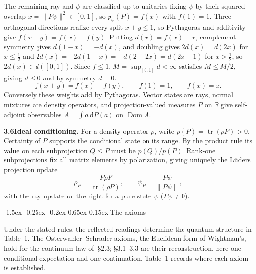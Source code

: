 \documentclass[10pt,a4paper]{article}
\makeatletter
\renewcommand\section{\@startsection{section}{1}{\z@}%
  {-1.5ex \@plus -0.25ex \@minus -0.2ex}%
  {0.65ex \@plus 0.15ex}%
  {\normalfont\large\bfseries}}
\newcommand{\dd}{\mathrm{d}}
\newcommand{\R}{\mathbb{R}}
\newcommand{\tr}{\operatorname{tr}}
\newcommand{\Dom}{\operatorname{Dom}}
\makeatother
\begin{document}
The remaining ray and $\psi$ are classified up to unitaries fixing $\psi$ by their squared overlap $x = \|P\psi\|^2 \in [0, 1]$, so $p_\psi(P) = f(x)$ with $f(1) = 1$. Three orthogonal directions realize every split $x + y \le 1$, so Pythagoras and additivity give $f(x + y) = f(x) + f(y)$. Putting $d(x) = f(x) - x$, complement symmetry gives $d(1 - x) = -d(x)$, and doubling gives $2d(x) = d(2x)$ for $x \le \frac{1}{2}$ and $2d(x) = -2d(1 - x) = -d(2 - 2x) = d(2x - 1)$ for $x > \frac{1}{2}$, so $2d(x) \in d([0, 1])$. Since $f \le 1$, $M = \sup_{[0,1]} d < \infty$ satisfies $M \le M/2$, giving $d \le 0$ and by symmetry $d = 0$:
\begin{equation}
  f(x + y) = f(x) + f(y), \qquad f(1) = 1, \qquad f(x) = x.
\end{equation}
Conversely these weights add by Pythagoras. Vector states are rays, normal mixtures are density operators, and projection-valued measures $P$ on $\R$ give self-adjoint observables $A = \int a\,\dd P(a)$ on $\Dom A$.

\vspace{1.5pt}
\noindent\textbf{3.6\enspace Ideal conditioning.} For a density operator $\rho$, write $p(P) = \tr(\rho P) > 0$. Certainty of $P$ supports the conditional state on its range. By the product rule its value on each subprojection $Q \le P$ must be $p(Q)/p(P)$. Rank-one subprojections fix all matrix elements by polarization, giving uniquely the L\"uders projection update
\begin{equation}
  \rho_P = \frac{P\rho P}{\tr(\rho P)}, \qquad \psi_P = \frac{P\psi}{\|P\psi\|},
\end{equation}
with the ray update on the right for a pure state $\psi$ ($P\psi \ne 0$).

\section{The axioms}

Under the stated rules, the reflected readings determine the quantum structure in Table~1. The Osterwalder--Schrader axioms, the Euclidean form of Wightman's, hold for the continuum law of~\S2.3; \S3.1--3.3 are their reconstruction, here one conditional expectation and one continuation. Table~1 records where each axiom is established.
\end{document}
